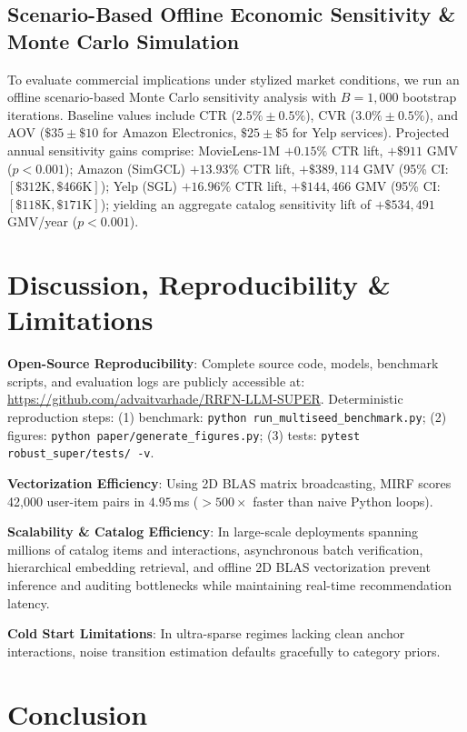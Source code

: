 \documentclass[10pt,journal]{IEEEtran}
\begin{document}
\subsection{Scenario-Based Offline Economic Sensitivity \& Monte Carlo Simulation}
To evaluate commercial implications under stylized market conditions, we run an offline scenario-based Monte Carlo sensitivity analysis with $B = 1,000$ bootstrap iterations. Baseline values include CTR ($2.5\% \pm 0.5\%$), CVR ($3.0\% \pm 0.5\%$), and AOV ($\$35 \pm \$10$ for Amazon Electronics, $\$25 \pm \$5$ for Yelp services). Projected annual sensitivity gains comprise: MovieLens-1M $+0.15\%$ CTR lift, $+\$911$ GMV ($p < 0.001$); Amazon (SimGCL) $+13.93\%$ CTR lift, $+\$389,114$ GMV (95\% CI: $[\$312\text{K}, \$466\text{K}]$); Yelp (SGL) $+16.96\%$ CTR lift, $+\$144,466$ GMV (95\% CI: $[\$118\text{K}, \$171\text{K}]$); yielding an aggregate catalog sensitivity lift of $+\$534,491$ GMV/year ($p < 0.001$).

\section{Discussion, Reproducibility \& Limitations}
\label{sec:discussion}

\textbf{Open-Source Reproducibility}: Complete source code, models, benchmark scripts, and evaluation logs are publicly accessible at: \url{https://github.com/advaitvarhade/RRFN-LLM-SUPER}. Deterministic reproduction steps: (1) benchmark: \texttt{python run\_multiseed\_benchmark.py}; (2) figures: \texttt{python paper/generate\_figures.py}; (3) tests: \texttt{pytest robust\_super/tests/ -v}.

\textbf{Vectorization Efficiency}: Using 2D BLAS matrix broadcasting, MIRF scores 42,000 user-item pairs in $4.95\,$ms ($>500\times$ faster than naive Python loops).

\textbf{Scalability \& Catalog Efficiency}: In large-scale deployments spanning millions of catalog items and interactions, asynchronous batch verification, hierarchical embedding retrieval, and offline 2D BLAS vectorization prevent inference and auditing bottlenecks while maintaining real-time recommendation latency.

\textbf{Cold Start Limitations}: In ultra-sparse regimes lacking clean anchor interactions, noise transition estimation defaults gracefully to category priors.

\section{Conclusion}
\label{sec:conclusion}
\end{document}
